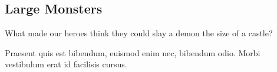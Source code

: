 \subsection{Large Monsters}

What made our heroes think they could slay a demon the size of a castle?

\begin{quotebox}
Praesent quis est bibendum, euismod enim nec, bibendum odio. Morbi vestibulum erat id facilisis cursus.
\end{quotebox}
